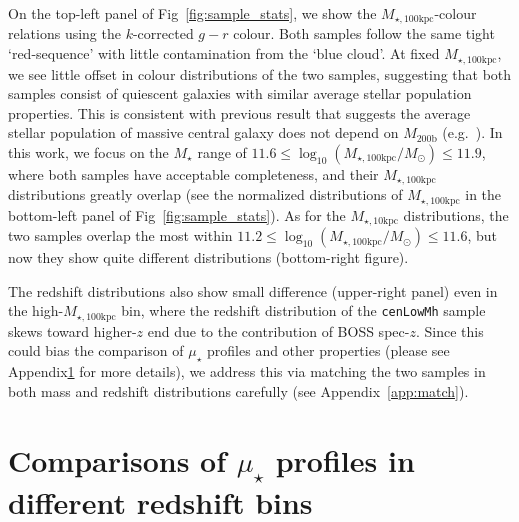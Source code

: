 \documentclass[a4paper,fleqn,usenatbib]{mnras}
\def\nbcg{\texttt{cenLowMh}}
\def\mstar{{$M_{\star}$}}
\def\mhalo{{$M_{\mathrm{200b}}$}}
\def\minn{{$M_{\star,10\mathrm{kpc}}$}}
\def\mtot{{$M_{\star,100\mathrm{kpc}}$}}
\def\logmtot{{$\log_{10} (M_{\star,100\mathrm{kpc}}/M_{\odot})$}}
\def\mden{{$\mu_{\star}$}}
\begin{document}
    On the top-left panel of Fig~\ref{fig:sample_stats}, we show the \mtot{}-colour 
    relations using the $k$-corrected $g-r$ colour. 
    Both samples follow the same tight `red-sequence' with little contamination 
    from the `blue cloud'.
    At fixed \mtot{}, we see little offset in colour distributions of the two 
    samples, suggesting that both samples consist of quiescent galaxies with 
    similar average stellar population properties.  
    This is consistent with previous result that suggests the average stellar 
    population of massive central galaxy does not depend on \mhalo{} 
    (e.g.\ \citealt{Park2007}).  
    In this work, we focus on the \mstar{} range of $11.6 \le$\logmtot{}$\le 11.9$, 
    where both samples have acceptable completeness, and their \mtot{} distributions 
    greatly overlap (see the normalized distributions of \mtot{} in the bottom-left 
    panel of Fig~\ref{fig:sample_stats}). 
    As for the \minn{} distributions, the two samples overlap the most within 
    $11.2 \le$\logmtot{}$\le 11.6$, but now they show quite different
    distributions (bottom-right figure).
    
    The redshift distributions also show small difference
    (upper-right panel) even in the high-\mtot{} bin, where the redshift distribution 
    of the \nbcg{} sample skews toward higher-$z$ end due to the contribution of BOSS 
    spec-$z$.
    Since this could bias the comparison of \mden{} profiles and other properties 
    (please see Appendix\ref{app:redshift} for more details), we address this via matching 
    the two samples in both mass and redshift distributions carefully
    (see Appendix~\ref{app:match}).

\section{Comparisons of \mden{} profiles in different redshift bins}
    \label{app:redshift}
    
\end{document}
